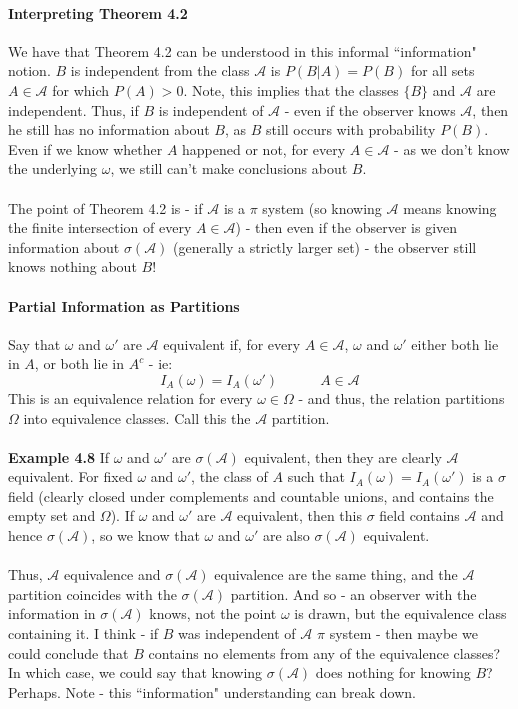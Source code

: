 \documentclass[12pt,a4paper]{article}
\newcommand{\1}[1]{\mathbbm{1}\left\{ #1 \right\}}
\newcommand{\acal}{\mathcal{A}}
\begin{document}
\paragraph{Interpreting Theorem 4.2} We have that Theorem 4.2 can be understood in this informal ``information" notion. $B$ is independent from the class $\acal$ is $P(B|A) = P(B)$ for all sets $A \in \acal$ for which $P(A) > 0$. Note, this implies that the classes $\{B\}$ and $\acal$ are independent. Thus, if $B$ is independent of $\acal$ - even if the observer knows $\acal$, then he still has no information about $B$, as $B$ still occurs with probability $P(B)$. Even if we know whether $A$ happened or not, for every $A \in \acal$ - as we don't know the underlying $\omega$, we still can't make conclusions about $B$.
\\\\
The point of Theorem 4.2 is - if $\acal$ is a $\pi$ system (so knowing $\acal$ means knowing the finite intersection of every $A \in \acal$) - then even if the observer is given information about $\sigma(\acal)$ (generally a strictly larger set) - the observer still knows nothing about $B$!

\paragraph{Partial Information as Partitions} Say that $\omega$ and $\omega'$ are $\acal$ equivalent if, for every $A \in \acal$, $\omega$ and $\omega'$ either both lie in $A$, or both lie in $A^c$ - ie:
$$
	I_A(\omega) = I_A(\omega') \quad\quad\quad A \in \acal
$$
This is an equivalence relation for every $\omega \in \Omega$ - and thus, the relation partitions $\Omega$ into equivalence classes. Call this the $\acal$ partition.
\\\\
\textbf{Example 4.8} If $\omega$ and $\omega'$ are $\sigma(\acal)$ equivalent, then they are clearly $\acal$ equivalent. For fixed $\omega$ and $\omega'$, the class of $A$ such that $I_A(\omega) = I_A(\omega')$ is a $\sigma$ field (clearly closed under complements and countable unions, and contains the empty set and $\Omega$). If $\omega$ and $\omega'$ are $\acal$ equivalent, then this $\sigma$ field contains $\acal$ and hence $\sigma(\acal)$, so we know that $\omega$ and $\omega'$ are also $\sigma(\acal)$ equivalent.
\\\\
Thus, $\acal$ equivalence and $\sigma(\acal)$ equivalence are the same thing, and the $\acal$ partition coincides with the $\sigma(\acal)$ partition. And so - an observer with the information in $\sigma(\acal)$ knows, not the point $\omega$ is drawn, but the equivalence class containing it. I think - if $B$ was independent of $\acal$ $\pi$ system - then maybe we could conclude that $B$ contains no elements from any of the equivalence classes? In which case, we could say that knowing $\sigma(\acal)$ does nothing for knowing $B$? Perhaps. Note - this ``information" understanding can break down.
\end{document}
